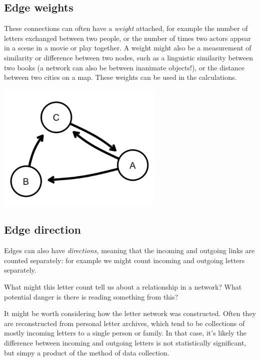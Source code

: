 \documentclass[
]{book}
\begin{document}
\hypertarget{edge-weights}{%
\subsection{Edge weights}\label{edge-weights}}

These connections can often have a \emph{weight} attached, for example the number of letters exchanged between two people, or the number of times two actors appear in a scene in a movie or play together. A weight might also be a measurement of similarity or difference between two nodes, such as a linguistic similarity between two books (a network can also be between inanimate objects!), or the distance between two cities on a map. These weights can be used in the calculations.

\includegraphics[width=3.125in,height=\textheight]{images/Screenshot 2022-09-26 at 11.42.58.png}

\hypertarget{edge-direction}{%
\subsection{Edge direction}\label{edge-direction}}

Edges can also have \emph{directions,} meaning that the incoming and outgoing links are counted separately: for example we might count incoming and outgoing letters separately.

What might this letter count tell us about a relationship in a network? What potential danger is there is reading something from this?

It might be worth considering how the letter network was constructed. Often they are reconstructed from personal letter archives, which tend to be collections of mostly incoming letters to a single person or family. In that case, it's likely the difference between incoming and outgoing letters is not statistically significant, but simpy a product of the method of data collection.
\end{document}
